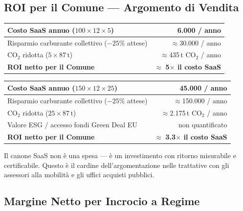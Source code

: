 \documentclass[a4paper,11pt]{article}
\begin{document}
\subsection{ROI per il Comune --- Argomento di Vendita}

\begin{tcolorbox}[
    enhanced, colback=green!4!white, colframe=SmartGreen,
    title=\textbf{Piano A --- 5 Incroci, Città Piccola}, boxrule=0.5mm
]
\begin{tabular}{lr}
Costo SaaS annuo ($100 \times 12 \times 5$) & \textbf{\texteuro{}6.000 / anno} \\
\midrule
Risparmio carburante collettivo ($-25\%$ attese) & $\approx$\texteuro{}30.000 / anno \\
CO$_2$ ridotta ($5 \times 87\,\text{t}$) & $\approx$435\,t CO$_2$ / anno \\
\midrule
\textbf{ROI netto per il Comune} & $\approx$ \textbf{5$\times$ il costo SaaS} \\
\end{tabular}
\end{tcolorbox}

\begin{tcolorbox}[
    enhanced, colback=green!4!white, colframe=SmartGreen,
    title=\textbf{Piano B --- 25 Incroci, Città Grande}, boxrule=0.5mm
]
\begin{tabular}{lr}
Costo SaaS annuo ($150 \times 12 \times 25$) & \textbf{\texteuro{}45.000 / anno} \\
\midrule
Risparmio carburante collettivo ($-25\%$ attese) & $\approx$\texteuro{}150.000 / anno \\
CO$_2$ ridotta ($25 \times 87\,\text{t}$) & $\approx$2.175\,t CO$_2$ / anno \\
Valore ESG / accesso fondi Green Deal EU & non quantificato \\
\midrule
\textbf{ROI netto per il Comune} & $\approx$ \textbf{3.3$\times$ il costo SaaS} \\
\end{tabular}
\end{tcolorbox}

\noindent Il canone SaaS non è una spesa --- è un investimento con ritorno misurabile
e certificabile. Questo è il cardine dell'argomentazione nelle trattative con
gli assessori alla mobilità e gli uffici acquisti pubblici.

\subsection{Margine Netto per Incrocio a Regime}
\end{document}
